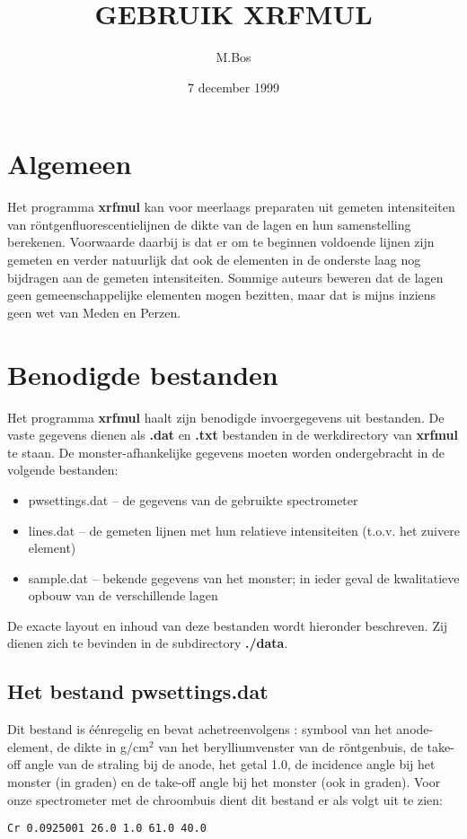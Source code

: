 \title{GEBRUIK XRFMUL}
\author{M.Bos}
\date{7 december 1999}

\maketitle
\section*{Algemeen}
Het programma {\bf xrfmul} kan voor meerlaags preparaten uit 
gemeten intensiteiten van r\"ontgenfluorescentielijnen de dikte van
de lagen en hun samenstelling berekenen. Voorwaarde daarbij is
dat er om te beginnen voldoende lijnen zijn gemeten en verder
natuurlijk dat ook de elementen in de onderste laag nog bijdragen
aan de gemeten intensiteiten. Sommige auteurs beweren dat de lagen
geen gemeenschappelijke elementen mogen bezitten, maar dat is mijns inziens
geen wet van Meden en Perzen.

\section*{Benodigde bestanden}
Het programma {\bf xrfmul} haalt zijn benodigde invoergegevens uit bestanden.
De vaste gegevens dienen als {\bf .dat} en {\bf .txt} bestanden in de
werkdirectory van {\bf xrfmul} te staan. De monster-afhankelijke
gegevens moeten worden ondergebracht in de volgende bestanden:
\begin{itemize}
\item pwsettings.dat -- de gegevens van de gebruikte  spectrometer
\item lines.dat -- de gemeten lijnen met hun relatieve intensiteiten (t.o.v.
het zuivere element)
\item sample.dat -- bekende gegevens van het monster; in ieder geval
de kwalitatieve opbouw van de verschillende lagen
\end{itemize}
De exacte layout en inhoud van deze bestanden wordt hieronder beschreven.
Zij dienen zich te bevinden in de subdirectory {\bf ./data}.

\subsection*{Het bestand pwsettings.dat}
Dit bestand
is \'e\'enregelig en bevat achetreenvolgens : symbool van het anode-element,
de dikte in g/cm$^2$ van het berylliumvenster van de r\"ontgenbuis,
de take-off angle van de straling bij de anode, het getal 1.0,
de incidence angle bij het monster (in graden) en de take-off angle
bij het monster (ook in graden).
Voor onze spectrometer met de chroombuis dient dit bestand er als volgt uit
te zien:
\begin{verbatim}
Cr 0.0925001 26.0 1.0 61.0 40.0
\end{verbatim}

